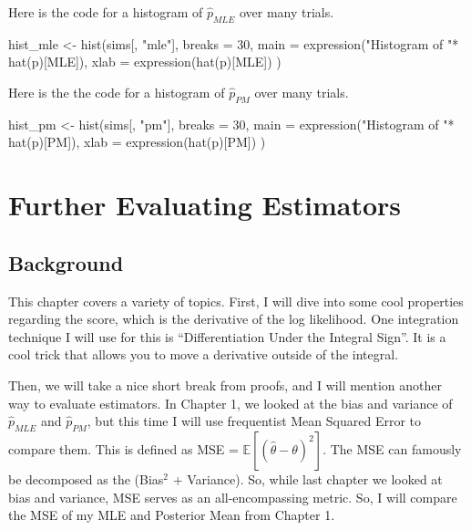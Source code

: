 \documentclass[
  letterpaper,
  DIV=11,
  numbers=noendperiod]{scrreprt}
\newenvironment{Shaded}{\begin{snugshade}}{\end{snugshade}}
\newcommand{\NormalTok}[1]{\textcolor[rgb]{0.00,0.23,0.31}{#1}}
\begin{document}
Here is the code for a histogram of \(\hat{p}_{MLE}\) over many trials.

\begin{Shaded}
\begin{Highlighting}[]
\NormalTok{hist\_mle \textless{}{-} hist(sims[, "mle"], }
\NormalTok{     breaks = 30, }
\NormalTok{     main = expression("Histogram of "* hat(p)[MLE]), }
\NormalTok{     xlab = expression(hat(p)[MLE])}
\NormalTok{    )}
\end{Highlighting}
\end{Shaded}

Here is the the code for a histogram of \(\hat{p}_{PM}\) over many
trials.

\begin{Shaded}
\begin{Highlighting}[]
\NormalTok{hist\_pm \textless{}{-} hist(sims[, "pm"], }
\NormalTok{     breaks = 30, }
\NormalTok{     main = expression("Histogram of "* hat(p)[PM]), }
\NormalTok{     xlab = expression(hat(p)[PM])}
\NormalTok{     )}
\end{Highlighting}
\end{Shaded}


\chapter{Further Evaluating
Estimators}\label{further-evaluating-estimators}

\section{Background}\label{background-2}

This chapter covers a variety of topics. First, I will dive into some
cool properties regarding the score, which is the derivative of the log
likelihood. One integration technique I will use for this is
``Differentiation Under the Integral Sign''. It is a cool trick that
allows you to move a derivative outside of the integral.

Then, we will take a nice short break from proofs, and I will mention
another way to evaluate estimators. In Chapter 1, we looked at the bias
and variance of \(\hat{p}_{MLE}\) and \(\hat{p}_{PM}\), but this time I
will use frequentist Mean Squared Error to compare them. This is defined
as MSE = \(\mathbb{E}[(\hat{\theta} - \theta)^2]\). The MSE can famously
be decomposed as the (Bias\(^2\) + Variance). So, while last chapter we
looked at bias and variance, MSE serves as an all-encompassing metric.
So, I will compare the MSE of my MLE and Posterior Mean from Chapter 1.
\end{document}
